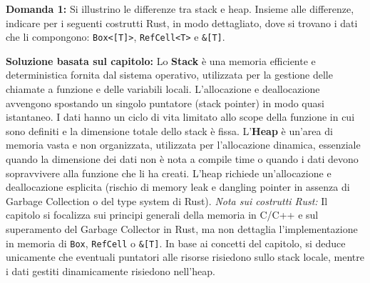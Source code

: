 \begin{exambox}
\textbf{Domanda 1:} Si illustrino le differenze tra stack e heap. Insieme alle differenze, indicare per i seguenti costrutti Rust, in modo dettagliato, dove si trovano i dati che li compongono: \texttt{Box<[T]>}, \texttt{RefCell<T>} e \texttt{\&[T]}.
\end{exambox}
\textbf{Soluzione basata sul capitolo:} 
Lo \textbf{Stack} è una memoria efficiente e deterministica fornita dal sistema operativo, utilizzata per la gestione delle chiamate a funzione e delle variabili locali. L'allocazione e deallocazione avvengono spostando un singolo puntatore (stack pointer) in modo quasi istantaneo. I dati hanno un ciclo di vita limitato allo scope della funzione in cui sono definiti e la dimensione totale dello stack è fissa.
L'\textbf{Heap} è un'area di memoria vasta e non organizzata, utilizzata per l'allocazione dinamica, essenziale quando la dimensione dei dati non è nota a compile time o quando i dati devono sopravvivere alla funzione che li ha creati. L'heap richiede un'allocazione e deallocazione esplicita (rischio di memory leak e dangling pointer in assenza di Garbage Collection o del type system di Rust).
\textit{Nota sui costrutti Rust:} Il capitolo si focalizza sui principi generali della memoria in C/C++ e sul superamento del Garbage Collector in Rust, ma non dettaglia l'implementazione in memoria di \texttt{Box}, \texttt{RefCell} o \texttt{\&[T]}. In base ai concetti del capitolo, si deduce unicamente che eventuali puntatori alle risorse risiedono sullo stack locale, mentre i dati gestiti dinamicamente risiedono nell'heap.

